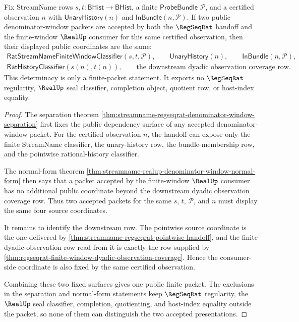 \begin{theorem}
\label{thm:streamname-pointwise-denominator-window-determinacy}
Fix StreamName rows $s,t:\mathsf{BHist}\to\mathsf{BHist}$, a finite
$\mathsf{ProbeBundle}$ $\mathcal P$, and a certified observation $n$ with
$\mathsf{UnaryHistory}(n)$ and $\mathsf{InBundle}(n,\mathcal P)$. If two
public denominator-window packets are accepted by both the $\RegSeqRat$
handoff and the finite-window $\RealUp$ consumer for this same certified
observation, then their displayed public coordinates are the same:
$$
\begin{gathered}
\mathsf{RatStreamNameFiniteWindowClassifier}(s,t,\mathcal P),\qquad
\mathsf{UnaryHistory}(n),\qquad
\mathsf{InBundle}(n,\mathcal P),\\
\mathsf{RatHistoryClassifier}(s(n),t(n)),\qquad
\text{the downstream dyadic observation coverage row.}
\end{gathered}
$$
This determinacy is only a finite-packet statement. It exports no
$\RegSeqRat$ regularity, $\RealUp$ seal classifier, completion object,
quotient row, or host-index equality.
\end{theorem}
\begin{proof}
The separation theorem
\autoref{thm:streamname-regseqrat-denominator-window-separation} first fixes
the public dependency surface of any accepted denominator-window packet. For
the certified observation $n$, the handoff can expose only the finite
StreamName classifier, the unary-history row, the bundle-membership row, and
the pointwise rational-history classifier.

The normal-form theorem
\autoref{thm:streamname-realup-denominator-window-normal-form} then says that
a packet accepted by the finite-window $\RealUp$ consumer has no additional
public coordinate beyond the downstream dyadic observation coverage row.
Thus two accepted packets for the same $s$, $t$, $\mathcal P$, and $n$ must
display the same four source coordinates.

It remains to identify the downstream row. The pointwise source coordinate is
the one delivered by
\autoref{thm:streamname-regseqrat-pointwise-handoff}, and the finite
dyadic-observation row read from it is exactly the row supplied by
\autoref{thm:regseqrat-finite-window-dyadic-observation-coverage}. Hence the
consumer-side coordinate is also fixed by the same certified observation.

Combining these two fixed surfaces gives one public finite packet. The
exclusions in the separation and normal-form statements keep $\RegSeqRat$
regularity, the $\RealUp$ seal classifier, completion, quotienting, and
host-index equality outside the packet, so none of them can distinguish the
two accepted presentations.
\end{proof}

